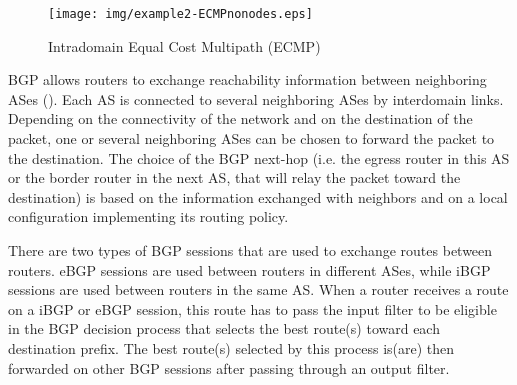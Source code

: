 \documentclass{acm_proc_article-sp}
\begin{document}
\begin{figure}[htbp]
  \centering
  \texttt{[image: img/example2-ECMPnonodes.eps]}
  \caption{Intradomain Equal Cost Multipath (ECMP)}
  \label{fig:example2ecmp}
\end{figure}

BGP allows routers to exchange reachability
information between neighboring ASes (\cite{bgp}). Each AS is
connected to several neighboring ASes by interdomain
links. Depending on the connectivity of the network and on the
destination of the packet, one or several neighboring ASes can be
chosen to forward the packet to the destination. The choice of the BGP next-hop 
(i.e. the egress router in this AS or the border router in the next AS, that will relay the packet
toward the destination) is based on the information exchanged with
neighbors and on a local configuration implementing its routing policy. 

There are two types of BGP sessions that are used to exchange routes
between routers. eBGP sessions are used between routers in different
ASes, while iBGP sessions are used between routers in the same AS. When
a router receives a route on a iBGP or eBGP session, this route has to pass the
input filter to be eligible
in the BGP decision process that selects the best route(s) toward each
destination prefix. The best route(s) selected by this process is(are) then
forwarded on other BGP sessions after passing through an output filter.
\end{document}
